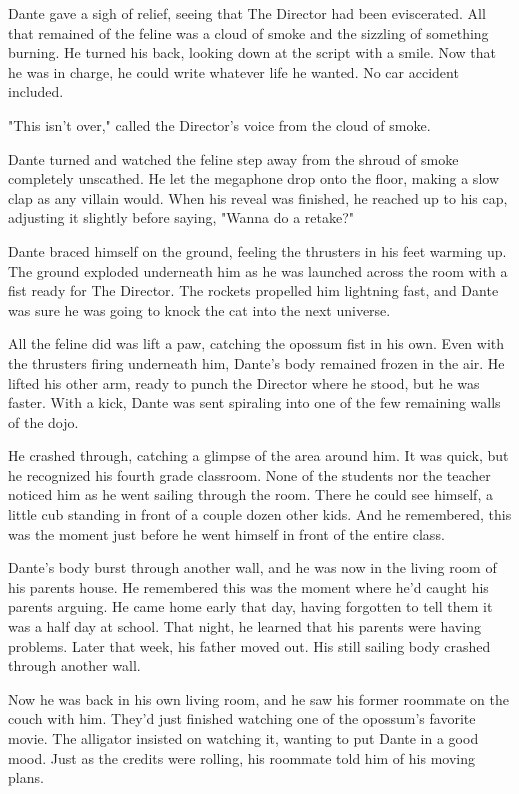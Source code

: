 Dante gave a sigh of relief, seeing that The Director had been eviscerated. All that remained of the feline was a cloud of smoke and the sizzling of something burning. He turned his back, looking down at the script with a smile. Now that he was in charge, he could write whatever life he wanted. No car accident included.

"This isn't over," called the Director's voice from the cloud of smoke.

Dante turned and watched the feline step away from the shroud of smoke completely unscathed. He let the megaphone drop onto the floor, making a slow clap as any villain would. When his reveal was finished, he reached up to his cap, adjusting it slightly before saying, "Wanna do a retake?"

Dante braced himself on the ground, feeling the thrusters in his feet warming up. The ground exploded underneath him as he was launched across the room with a fist ready for The Director. The rockets propelled him lightning fast, and Dante was sure he was going to knock the cat into the next universe.

All the feline did was lift a paw, catching the opossum fist in his own. Even with the thrusters firing underneath him, Dante's body remained frozen in the air. He lifted his other arm, ready to punch the Director where he stood, but he was faster. With a kick, Dante was sent spiraling into one of the few remaining walls of the dojo.

He crashed through, catching a glimpse of the area around him. It was quick, but he recognized his fourth grade classroom. None of the students nor the teacher noticed him as he went sailing through the room. There he could see himself, a little cub standing in front of a couple dozen other kids. And he remembered, this was the moment just before he went himself in front of the entire class.

Dante's body burst through another wall, and he was now in the living room of his parents house. He remembered this was the moment where he'd caught his parents arguing. He came home early that day, having forgotten to tell them it was a half day at school. That night, he learned that his parents were having problems. Later that week, his father moved out. His still sailing body crashed through another wall.

Now he was back in his own living room, and he saw his former roommate on the couch with him. They'd just finished watching one of the opossum's favorite movie. The alligator insisted on watching it, wanting to put Dante in a good mood. Just as the credits were rolling, his roommate told him of his moving plans.

